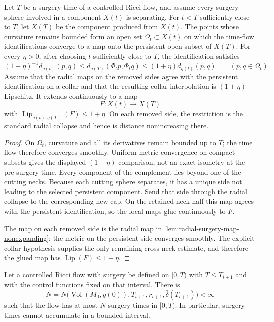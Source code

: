 \begin{theorem}
\label{thm:separating-surgery-map}
\notready
Let $T$ be a surgery time of a controlled Ricci flow, and assume every
surgery sphere involved in a component $X(t)$ is separating.  For $t<T$
sufficiently close to $T$, let $X(T)$ be the component produced from
$X(t)$.  The points whose curvature remains bounded form an open set
$\Omega_t\subset X(t)$ on which the time-flow identifications converge to a
map onto the persistent open subset of $X(T)$.  For every $\eta>0$, after
choosing $t$ sufficiently close to $T$, the identification satisfies
\[
 (1+\eta)^{-1}d_{g(t)}(p,q)\le d_{g(T)}(\Phi_t p,\Phi_t q)
 \le(1+\eta)d_{g(t)}(p,q)
 \qquad(p,q\in\Omega_t).
\]
Assume that the radial maps on the removed sides agree with the persistent
identification on a collar and that the resulting collar interpolation is
$(1+\eta)$-Lipschitz.
It extends continuously to a map
\[
 F\colon X(t)\longrightarrow X(T)
\]
with $\operatorname{Lip}_{g(t),g(T)}(F)\le1+\eta$.  On each removed side,
the restriction is the standard radial collapse and hence is distance
nonincreasing there.
\end{theorem}

\begin{proof}
On $\Omega_t$, curvature and all its derivatives remain bounded up to $T$;
the time flow therefore converges smoothly.  Uniform metric convergence on
compact subsets gives the displayed $(1+\eta)$ comparison, not an exact
isometry at the pre-surgery time.
Every component of the complement lies beyond one of the cutting necks.
Because each cutting sphere separates, it has a unique side not leading to
the selected persistent component.  Send that side through the radial
collapse to the corresponding new cap.  On the retained neck half this map
agrees with the persistent identification, so the local maps glue
continuously to $F$.

The map on each removed side is the radial map in
\ref{lem:radial-surgery-map-nonexpanding}; the metric on the persistent side
converges smoothly.  The explicit collar hypothesis supplies the only
remaining cross-neck estimate, and therefore the glued map has
$\operatorname{Lip}(F)\le1+\eta$.
\end{proof}

\begin{theorem}
\label{thm:finite-interval-surgery-bound}
\notready
Let a controlled Ricci flow with surgery be defined on $[0,T)$ with
$T\le T_{i+1}$ and with the control functions fixed on that interval.  There
is
\[
 N=N\bigl(\operatorname{Vol}(M_0,g(0)),T_{i+1},r_{i+1},
             \bar\delta(T_{i+1})\bigr)<\infty
\]
such that the flow has at most $N$ surgery times in $[0,T)$.  In particular,
surgery times cannot accumulate in a bounded interval.
\end{theorem}

